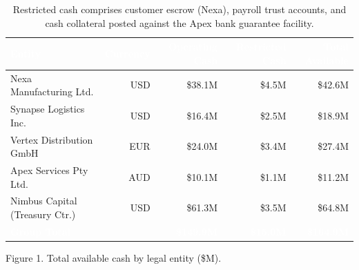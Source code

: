 \documentclass[11pt,a4paper]{scrreprt}
\begin{document}
\begin{table}[h!]
\centering
\small
\begin{tabularx}{\textwidth}{@{}Xrrrr@{}}
\toprule
\rowcolor{treasurynavy}
\textcolor{white}{\bfseries Entity} & \textcolor{white}{\bfseries Currency} &
\textcolor{white}{\bfseries Operating Cash} & \textcolor{white}{\bfseries Restricted Cash} &
\textcolor{white}{\bfseries Total Available} \\
\midrule
Nexa Manufacturing Ltd.       & USD & \$38.1M & \$4.5M & \$42.6M \\
\rowcolor{treasurygray}
Synapse Logistics Inc.        & USD & \$16.4M & \$2.5M & \$18.9M \\
Vertex Distribution GmbH      & EUR & \$24.0M & \$3.4M & \$27.4M \\
\rowcolor{treasurygray}
Apex Services Pty Ltd.        & AUD & \$10.1M & \$1.1M & \$11.2M \\
Nimbus Capital (Treasury Ctr.) & USD & \$61.3M & \$3.5M & \$64.8M \\
\midrule
\rowcolor{treasuryteal}
\textcolor{white}{\bfseries Group Total} & & \textcolor{white}{\bfseries \$149.9M} &
\textcolor{white}{\bfseries \$15.0M} & \textcolor{white}{\bfseries \$164.9M} \\
\bottomrule
\end{tabularx}
\caption*{\footnotesize\color{treasurymuted}Restricted cash comprises customer escrow
(Nexa), payroll trust accounts, and cash collateral posted against the Apex bank
guarantee facility.}
\end{table}

\vspace{-0.2cm}
\begin{center}

{\footnotesize\color{treasurymuted}Figure 1. Total available cash by legal
entity (\$M).}
\end{center}
\end{document}
